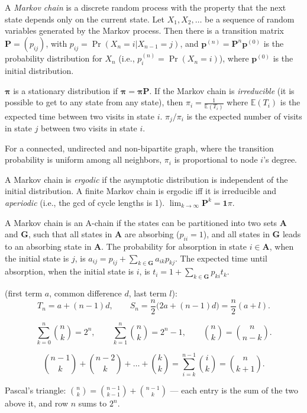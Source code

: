 A \emph{Markov chain} is a discrete random process with the property that the next state depends only on the current state.
Let $X_1,X_2,\ldots$ be a sequence of random variables generated by the Markov process.
Then there is a transition matrix $\mathbf{P} = (p_{ij})$, with $p_{ij} = \Pr(X_n = i | X_{n-1} = j)$,
and $\mathbf{p}^{(n)} = \mathbf P^n \mathbf p^{(0)}$ is the probability distribution for $X_n$ (i.e., $p^{(n)}_i = \Pr(X_n = i)$),
where $\mathbf{p}^{(0)}$ is the initial distribution.

$\mathbf{\pi}$ is a stationary distribution if $\mathbf{\pi} = \mathbf{\pi P}$.
If the Markov chain is \emph{irreducible} (it is possible to get to any state from any state),
then $\pi_i = \frac{1}{\mathbb{E}(T_i)}$ where $\mathbb{E}(T_i)$  is the expected time between two visits in state $i$.
$\pi_j/\pi_i$ is the expected number of visits in state $j$ between two visits in state $i$.

For a connected, undirected and non-bipartite graph, where the transition probability is uniform among all neighbors, $\pi_i$ is proportional to node $i$'s degree.

A Markov chain is \emph{ergodic} if the asymptotic distribution is independent of the initial distribution.
A finite Markov chain is ergodic iff it is irreducible and \emph{aperiodic} (i.e., the gcd of cycle lengths is 1).
$\lim_{k\rightarrow\infty}\mathbf{P}^k = \mathbf{1}\pi$.

A Markov chain is an A-chain if the states can be partitioned into two sets $\mathbf{A}$ and $\mathbf{G}$, such that all states in $\mathbf{A}$ are absorbing ($p_{ii}=1$), and all states in $\mathbf{G}$ leads to an absorbing state in $\mathbf{A}$.
The probability for absorption in state $i\in\mathbf{A}$, when the initial state is $j$, is $a_{ij} = p_{ij}+\sum_{k\in\mathbf{G}} a_{ik}p_{kj}$.
The expected time until absorption, when the initial state is $i$, is $t_i = 1+\sum_{k\in\mathbf{G}}p_{ki}t_k$.
\fi


 (first term $a$, common difference $d$, last term $l$):
\[ T_n=a+(n-1)d, \qquad
S_n=\frac{n}{2}\big(2a+(n-1)d\big)=\frac{n}{2}(a+l). \]

\[ \sum_{k=0}^{n}\binom{n}{k}=2^n, \qquad
\sum_{k=1}^{n}\binom{n}{k}=2^n-1, \qquad
\binom{n}{k}=\binom{n}{n-k}. \]

\[ \binom{n-1}{k}+\binom{n-2}{k}+\dots+\binom{k}{k}
=\sum_{i=k}^{n-1}\binom{i}{k}=\binom{n}{k+1}. \]

Pascal's triangle: $\binom{n}{k}=\binom{n-1}{k-1}+\binom{n-1}{k}$ --- each entry is the sum of the two above it, and row $n$ sums to $2^n$.
